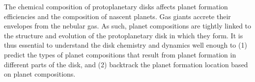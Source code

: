 \documentclass[apj]{emulateapj}
\newcommand{\emgr}[1]{\emph{ \color{gray} #1}}
\begin{document}


The chemical composition of protoplanetary disks affects planet formation efficiencies and the composition of nascent planets.
Gas giants accrete their envelopes from the nebular gas. As such, planet compositions are tightly linked to the structure and evolution of the protoplanetary disk in which they form. It is thus essential to understand the disk chemistry and dynamics well enough to (1) predict the types of planet compositions that result from planet formation in different parts of the disk, and (2) backtrack the planet formation location based on planet compositions. %





\end{document}
